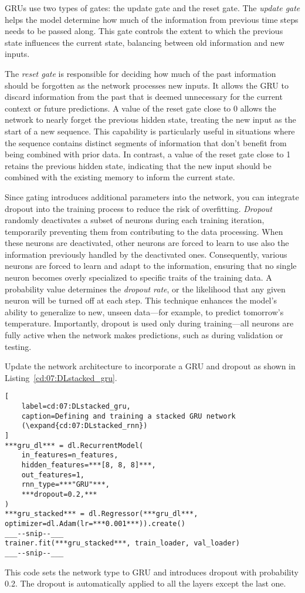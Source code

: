 GRUs use two types of gates: the update gate and the reset gate. 
The \emph{update gate} helps the model determine how much of the information from previous time steps needs to be passed along. This gate controls the extent to which the previous state influences the current state, balancing between old information and new inputs.

The \emph{reset gate} is responsible for deciding how much of the past information should be forgotten as the network processes new inputs. It allows the GRU to discard information from the past that is deemed unnecessary for the current context or future predictions. A value of the reset gate close to 0 allows the network to nearly forget the previous hidden state, treating the new input as the start of a new sequence. This capability is particularly useful in situations where the sequence contains distinct segments of information that don't benefit from being combined with prior data. In contrast, a value of the reset gate close to 1 retains the previous hidden state, indicating that the new input should be combined with the existing memory to inform the current state.

Since gating introduces additional parameters into the network, you can integrate dropout into the training process to reduce the risk of overfitting. \emph{Dropout} randomly deactivates a subset of neurons during each training iteration, temporarily preventing them from contributing to the data processing. When these neurons are deactivated, other neurons are forced to learn to use also the information previously handled by the deactivated ones. Consequently, various neurons are forced to learn and adapt to the information, ensuring that no single neuron becomes overly specialized to specific traits of the training data. A probability value determines the \emph{dropout rate}, or the likelihood that any given neuron will be turned off at each step. This technique enhances the model's ability to generalize to new, unseen data---for example, to predict tomorrow's temperature. Importantly, dropout is used only during training---all neurons are fully active when the network makes predictions, such as during validation or testing.

Update the network architecture to incorporate a GRU and dropout as shown in Listing~\ref{cd:07:DLstacked_gru}. 
\begin{lstlisting}[
    label=cd:07:DLstacked_gru,
    caption=Defining and training a stacked GRU network
    (\expand{cd:07:DLstacked_rnn})
]
***gru_dl*** = dl.RecurrentModel(
    in_features=n_features,
    hidden_features=***[8, 8, 8]***,
    out_features=1,
    rnn_type=***"GRU"***,
    ***dropout=0.2,***
)
***gru_stacked*** = dl.Regressor(***gru_dl***, optimizer=dl.Adam(lr=***0.001***)).create()
___--snip--___
trainer.fit(***gru_stacked***, train_loader, val_loader)
___--snip--___
\end{lstlisting}
This code sets the network type to GRU and introduces dropout with probability 0.2. The dropout is automatically applied to all the layers except the last one.

